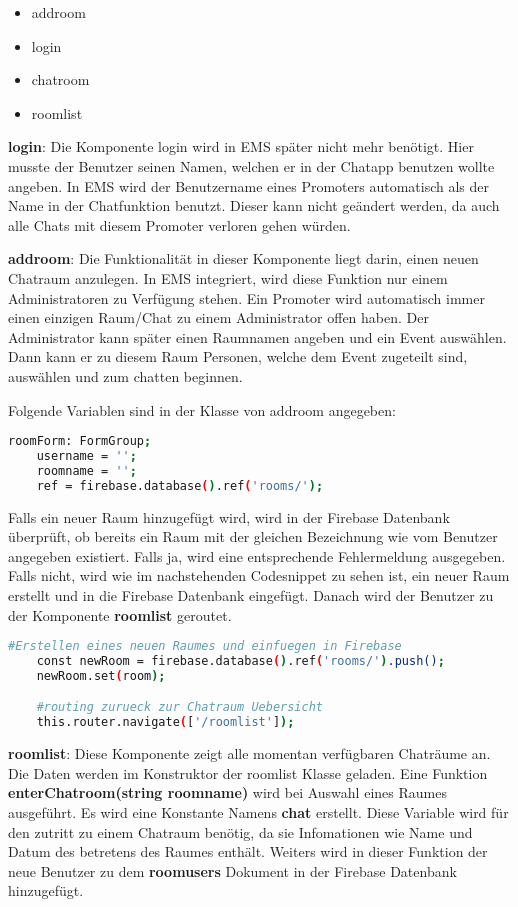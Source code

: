 \begin{itemize}
	\item addroom
	\item login
	\item chatroom
	\item roomlist
\end{itemize}

\textbf{login}: Die Komponente login wird in EMS später nicht mehr benötigt. Hier musste der Benutzer seinen Namen, welchen er in der Chatapp benutzen wollte angeben. In EMS wird der Benutzername eines Promoters automatisch
als der Name in der Chatfunktion benutzt. Dieser kann nicht geändert werden, da auch alle Chats mit diesem Promoter verloren gehen würden.

\textbf{addroom}: Die Funktionalität in dieser Komponente liegt darin, einen neuen Chatraum anzulegen. In EMS integriert, wird diese Funktion nur einem Administratoren zu
Verfügung stehen. Ein Promoter wird automatisch immer einen einzigen Raum/Chat zu einem Administrator offen haben. Der Administrator kann später einen Raumnamen angeben und ein Event auswählen. Dann kann er zu diesem Raum Personen,
welche dem Event zugeteilt sind, auswählen und zum chatten beginnen.

Folgende Variablen sind in der Klasse von addroom angegeben:

\begin{lstlisting}[language=bash]
    roomForm: FormGroup;
    username = '';
    roomname = '';
    ref = firebase.database().ref('rooms/');
\end{lstlisting}

Falls ein neuer Raum hinzugefügt wird, wird in der Firebase Datenbank überprüft, ob bereits ein Raum mit der gleichen Bezeichnung wie vom Benutzer angegeben existiert. Falls ja, wird eine entsprechende Fehlermeldung ausgegeben. Falls
nicht, wird wie im nachstehenden Codesnippet zu sehen ist, ein neuer Raum erstellt und in die Firebase Datenbank eingefügt. Danach wird der Benutzer zu der Komponente \textbf{roomlist} geroutet.

\begin{lstlisting}[language=bash]
    #Erstellen eines neuen Raumes und einfuegen in Firebase
    const newRoom = firebase.database().ref('rooms/').push();
    newRoom.set(room);

    #routing zurueck zur Chatraum Uebersicht
    this.router.navigate(['/roomlist']);
\end{lstlisting}

\textbf{roomlist}: Diese Komponente zeigt alle momentan verfügbaren Chaträume an. Die Daten werden im Konstruktor der roomlist Klasse geladen.\newline
Eine Funktion \textbf{enterChatroom(string roomname)} wird bei Auswahl eines Raumes ausgeführt. Es wird eine Konstante Namens \textbf{chat} erstellt. Diese Variable wird für den zutritt zu einem Chatraum benötig, da sie 
Infomationen wie Name und Datum des betretens des Raumes enthält. Weiters wird in dieser Funktion der neue Benutzer zu dem \textbf{roomusers} Dokument in der Firebase Datenbank hinzugefügt.


